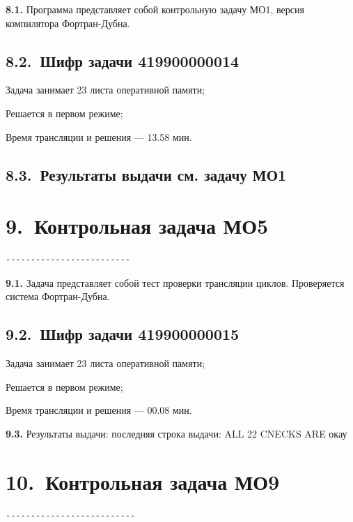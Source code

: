 \documentclass[11pt,a4paper]{article}
\begin{document}
\par\textbf{8.1.} Программа представляет собой контрольную задачу МО1, версия компилятора Фортран-Дубна.\par
\subsection*{8.2.~Шифр задачи 419900000014}
Задача занимает 23 листа оперативной памяти;

Решается в первом режиме;

Время трансляции и решения --- 13.58 мин.

\subsection*{8.3.~Результаты выдачи см. задачу МО1}
\section*{9.~Контрольная задача МО5}
\begin{center}\small
\begin{BVerbatim}
-------------------------
\end{BVerbatim}
\end{center}

\par\textbf{9.1.} Задача представляет собой тест проверки трансляции циклов. Проверяется система Фортран-Дубна.\par
\subsection*{9.2.~Шифр задачи 419900000015}
Задача занимает 23 листа оперативной памяти;

Решается в первом режиме;

Время трансляции и решения --- 00.08 мин.

\par\textbf{9.3.} Результаты выдачи: последняя строка выдачи: ALL 22 CNECKS ARE окау\par
\section*{10.~Контрольная задача МО9}
\begin{center}\small
\begin{BVerbatim}
--------------------------
\end{BVerbatim}
\end{center}
\end{document}
